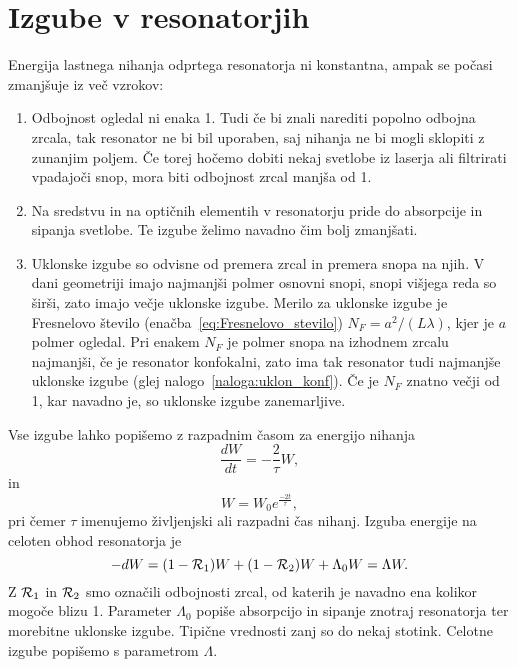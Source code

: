 \section{Izgube v resonatorjih}
Energija lastnega nihanja odprtega resonatorja ni konstantna, ampak se počasi
zmanjšuje iz več vzrokov:
\begin{enumerate}
\item Odbojnost ogledal ni enaka 1. Tudi če bi znali narediti popolno odbojna zrcala, 
tak resonator ne bi bil uporaben, saj nihanja ne bi mogli sklopiti z zunanjim poljem. Če 
torej hočemo dobiti nekaj svetlobe iz laserja ali filtrirati vpadajoči
snop, mora biti odbojnost zrcal manjša od 1.\\
\item Na sredstvu in na optičnih elementih v resonatorju pride do absorpcije in
sipanja svetlobe. Te izgube želimo navadno čim bolj zmanjšati.\\
\item Uklonske izgube so odvisne od premera zrcal in premera snopa na njih.
V dani geometriji imajo najmanjši polmer osnovni snopi, snopi višjega
reda so širši, zato imajo večje uklonske izgube. Merilo za uklonske
izgube je Fresnelovo število (enačba~\ref{eq:Fresnelovo_stevilo}) 
$N_{F}=a^{2}/(L\lambda)$, kjer je $a$ polmer ogledal. Pri enakem $N_{F}$ je
polmer snopa na izhodnem zrcalu najmanjši, če je resonator konfokalni, 
zato ima tak resonator tudi najmanjše uklonske izgube (glej nalogo~\ref{naloga:uklon_konf}).
Če je $N_{F}$ znatno večji od 1, kar navadno je, so uklonske izgube zanemarljive. \\
\end{enumerate}

Vse izgube lahko popišemo z razpadnim časom za energijo nihanja 
\begin{equation}
\frac{dW}{dt}=-\frac{2}{\tau}W,
\label{eq:dW}
\end{equation}
in 
\begin{equation}
W = W_0 e^{\frac{-2t}{\tau}},
\label{eq:dW1}
\end{equation}
pri čemer $\tau$ imenujemo življenjski ali razpadni čas nihanj.
Izguba energije na celoten obhod resonatorja je
\begin{equation}
-dW = (1-{\cal R}_{1})W+(1-{\cal R}_{2})W +\Lambda_{0} W = \Lambda W.
\label{eq:Lambda}
\end{equation}
Z ${\cal R}_{1}$ in ${\cal R}_{2}$ smo označili odbojnosti zrcal, od katerih je navadno ena
kolikor mogoče blizu 1. Parameter $\Lambda_{0}$ popiše absorpcijo in
sipanje znotraj resonatorja ter morebitne uklonske izgube. Tipične vrednosti 
zanj so do nekaj stotink. Celotne izgube popišemo s parametrom $\Lambda$. 

